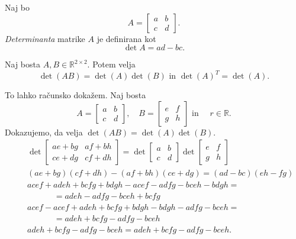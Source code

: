 \documentclass[GmVic, tisk]{gv}
\newcommand{\R}{\mathbb R}
\begin{document}

\begin{definicija} Naj bo        
$$A=
     \begin{bmatrix}
         a&b\\
         c&d
      \end{bmatrix}.
$$
{\em Determinanta} matrike $A$ je definirana kot $$\det A =ad - bc.$$
\end{definicija}

\begin{trditev}\label{trditev o determinantah} Naj bosta $A, B \in \R^{2\times 2}$. Potem velja $$\det(AB)= \det(A)\det(B) \mbox{ in } \det(A)^T=\det(A).$$
\end{trditev}

\begin{dokaz} To lahko računsko dokažem. Naj bosta
$$A=
     \begin{bmatrix}
         a&b\\
         c&d
      \end{bmatrix},  \quad
  B=
     \begin{bmatrix}
         e&f\\
         g&h      \end{bmatrix} \mbox{ in } \quad r\in \R.
$$
Dokazujemo, da  velja $\det(AB)=\det(A)\det(B).$
\begin{eqnarray*}
&&\det \begin{bmatrix}
         ae+bg&af+bh\\
         ce+dg&cf+dh
      \end{bmatrix} =
\det 
     \begin{bmatrix}
         a&b\\
         c&d
      \end{bmatrix}
  \det
     \begin{bmatrix}
         e&f\\
         g&h      
	\end{bmatrix}\\
&&(ae+bg)(cf+dh)-(af+bh)(ce+dg)= (ad-bc)(eh-fg)\\
&&acef+adeh+bcfg+bdgh-acef-adfg-bceh-bdgh = \\
&& \phantom{hancka}= adeh-adfg-bceh+bcfg \\
&&acef-acef+adeh+bcfg+bdgh-bdgh -adfg-bceh =\\
&&\phantom{hancka}=adeh+bcfg -adfg-bceh\\
&&adeh+bcfg-adfg-bceh=adeh+bcfg-adfg-bceh.
\end{eqnarray*}
\end{dokaz}
\end{document}
